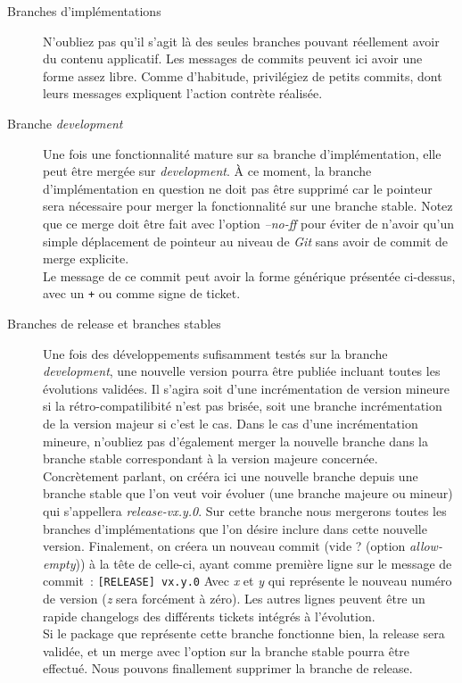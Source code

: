 \begin{description}
	\item[Branches d'implémentations]
		N'oubliez pas qu'il s'agit là des seules branches pouvant réellement avoir du contenu applicatif.
		Les messages de commits peuvent ici avoir une forme assez libre.
		Comme d'habitude, privilégiez de petits commits, dont leurs messages expliquent l'action contrète réalisée.
	\item[Branche \emph{development}]
		Une fois une fonctionnalité mature sur sa branche d'implémentation, elle peut être mergée sur \emph{development}.
		À ce moment, la branche d'implémentation en question ne doit pas être supprimé car le pointeur sera nécessaire pour merger la fonctionnalité sur une branche stable.
		Notez que ce merge doit être fait avec l'option \emph{--no-ff} pour éviter de n'avoir qu'un simple déplacement de pointeur au niveau de \emph{Git} sans avoir de commit de merge explicite.\\

		Le message de ce commit peut avoir la forme générique présentée ci-dessus, avec un {\tt+} ou {\tt*} comme signe de ticket.
	\item[Branches de release et branches stables]
		Une fois des développements sufisamment testés sur la branche \emph{development}, une nouvelle version pourra être publiée incluant toutes les évolutions validées.
		Il s'agira soit d'une incrémentation de version mineure si la rétro-compatilibité n'est pas brisée, soit une branche incrémentation de la version majeur si c'est le cas.
		Dans le cas d'une incrémentation mineure, n'oubliez pas d'également merger la nouvelle branche dans la branche stable correspondant à la version majeure concernée.\\

		Concrètement parlant, on crééra ici une nouvelle branche depuis une branche stable que l'on veut voir évoluer (une branche majeure ou mineur) qui s'appellera \emph{release-vx.y.0}.
		Sur cette branche nous mergerons toutes les branches d'implémentations que l'on désire inclure dans cette nouvelle version.
		Finalement, on créera un nouveau commit (vide ? (option \emph{allow-empty})) à la tête de celle-ci, ayant comme première ligne sur le message de commit~:
		{\tt[RELEASE] vx.y.0}
		Avec \emph{x} et \emph{y} qui représente le nouveau numéro de version (\emph{z} sera forcément à zéro).
		Les autres lignes peuvent être un rapide changelogs des différents tickets intégrés à l'évolution.\\
		Si le package que représente cette branche fonctionne bien, la release sera validée, et un merge avec l'option  sur la branche stable pourra être effectué.
		Nous pouvons finallement supprimer la branche de release.


\end{description}
